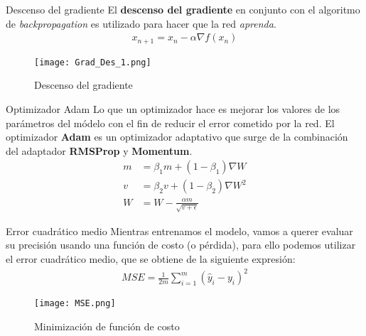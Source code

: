 \begin{frame}{Descenso del gradiente}
    El \textbf{descenso del gradiente} en conjunto con el algoritmo de \emph{backpropagation} es utilizado para hacer que la red
    \emph{aprenda}.
    \begin{align}
        \label{eqn:SRCNN_DescensoGradiente}
        x_{n+1}=x_n-\alpha\nabla f(x_n)
    \end{align}
    \begin{figure}[H]
        \label{fig:SRCNN_GradDescent}
        \centering
        \texttt{[image: Grad\_Des\_1.png]}
        \caption{Descenso del gradiente}
    \end{figure}
\end{frame}

\begin{frame}{Optimizador Adam}
    Lo que un optimizador \cite{AdamOptimizador} hace es mejorar los valores de los parámetros del módelo con el fin de reducir
    el error cometido por la red. El optimizador \textbf{Adam} es un optimizador adaptativo que surge de la combinación del
    adaptador \textbf{RMSProp} y \textbf{Momentum}.
    \begin{equation}
        \label{eqn:SRCNN_Adam}
        \begin{split}
            m&=\beta_1m+(1-\beta_1)\nabla W\\
            v&=\beta_2v+(1-\beta_2)\nabla W^2\\
            W&=W-\frac{\alpha m}{\sqrt{v+\epsilon}}
        \end{split}
    \end{equation}
\end{frame}

\begin{frame}{Error cuadrático medio}
    Mientras entrenamos el modelo, vamos a querer evaluar su precisión usando una función de costo (o pérdida), para ello podemos
    utilizar el error cuadrático medio, que se obtiene de la siguiente expresión:
    \begin{align}
        \label{eqn:SRCNN_MSE}
        MSE=\frac{1}{2m}\sum_{i=1}^{m}(\hat{y}_i-y_i)^2
    \end{align}
    \begin{figure}[H]
        \label{fig:SRCNN_MSE}
        \centering
        \texttt{[image: MSE.png]}
        \caption{Minimización de función de costo}
    \end{figure}
\end{frame}

